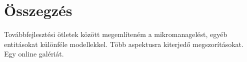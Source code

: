 \chapter{Összegzés}
\label{ch:sum}


Továbbfejlesztési ötletek között megemlíteném a mikromanagelést, egyéb entitásokat különféle modellekkel. Több aspektusra kiterjedő megszorításokat. Egy online galériát.
